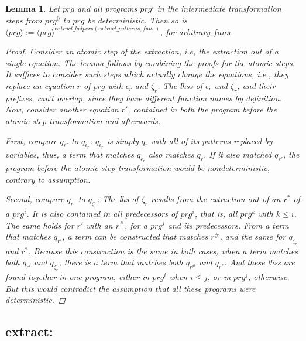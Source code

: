 \documentclass[11pt]{article} %
\newtheorem*{lemma*}{Lemma}
\begin{document}
\begin{lemma*}

Let $prg$ and all programs $prg^i$ in the intermediate transformation steps from $prg^0$ to $prg$ be deterministic. Then so is $\langle prg \rangle := \langle prg \rangle^{extract\_helpers(extract\_patterns, funs)}$, for arbitrary $funs$.

\begin{proof}

Consider an atomic step of the extraction, i.e, the extraction out of a single equation. The lemma follows by combining the proofs for the atomic steps. It suffices to consider such steps which actually change the equations, i.e., they replace an equation $r$ of $prg$ with $\epsilon_r$ and $\zeta_r$. The lhss of $\epsilon_r$ and $\zeta_r$, and their prefixes, can't overlap, since they have different function names by definition. Now, consider another equation $r'$, contained in both the program before the atomic step transformation and afterwards.

First, compare $q_{r'}$ to $q_{\epsilon_r}$: $q_{\epsilon_r}$ is simply $q_r$ with all of its patterns replaced by variables, thus, a term that matches $q_{\epsilon_r}$ also matches $q_r$. If it also matched $q_{r'}$, the program before the atomic step transformation would be nondeterministic, contrary to assumption.

Second, compare $q_{r'}$ to $q_{\zeta_r}$: The lhs of $\zeta_r$ results from the extraction out of an $r^*$ of a $prg^i$. It is also contained in all predecessors of $prg^i$, that is, all $prg^k$ with $k \leq i$. The same holds for $r'$ with an $r^\#$, for a $prg^j$ and its predecessors. From a term that matches $q_{r'}$, a term can be constructed that matches $r^\#$, and the same for $q_{\zeta_r}$ and $r^*$. Because this construction is the same in both cases, when a term matches both $q_{r'}$ and $q_{\zeta_r}$, there is a term that matches both $q_{r^\#}$ and $q_{r^*}$. And these lhss are found together in one program, either in $prg^i$ when $i \leq j$, or in $prg^j$, otherwise. But this would contradict the assumption that all these programs were deterministic.

\end{proof}

\end{lemma*}

\subsection*{extract:}
\end{document}
